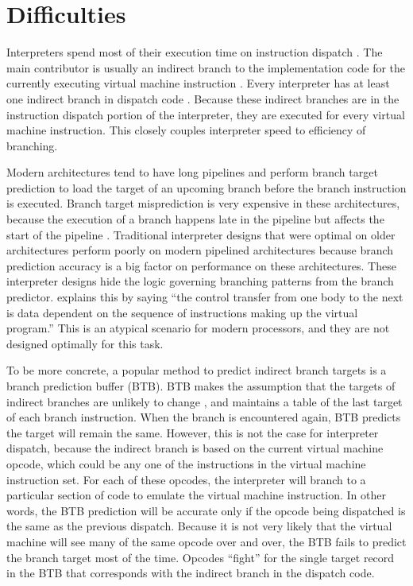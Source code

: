 	\section{Difficulties}
		Interpreters spend most of their execution time on instruction dispatch \citep{modernarchvm}. The main contributor is usually an indirect branch to the implementation code for the currently executing virtual machine instruction \citep{optimizingindirectbranch}. Every interpreter has at least one indirect branch in dispatch code \citep{modernarchvm}. Because these indirect branches are in the instruction dispatch portion of the interpreter, they are executed for every virtual machine instruction. This closely couples interpreter speed to efficiency of branching.
		
		Modern architectures tend to have long pipelines and perform branch target prediction to load the target of an upcoming branch before the branch instruction is executed. Branch target misprediction is very expensive in these architectures, because the execution of a branch happens late in the pipeline but affects the start of the pipeline \citep{optimizingindirectbranch}. Traditional interpreter designs that were optimal on older architectures perform poorly on modern pipelined architectures because branch prediction accuracy is a big factor on performance on these architectures. These interpreter designs hide the logic governing branching patterns from the branch predictor. \cite{yeti} explains this by saying ``the control transfer from one body to the next is data dependent on the sequence of instructions making up the virtual program.'' This is an atypical scenario for modern processors, and they are not designed optimally for this task.
		
		To be more concrete, a popular method to predict indirect branch targets is a branch prediction buffer (BTB). BTB makes the assumption that the targets of indirect branches are unlikely to change \citep{yeti}, and maintains a table of the last target of each branch instruction. When the branch is encountered again, BTB predicts the target will remain the same. However, this is not the case for interpreter dispatch, because the indirect branch is based on the current virtual machine opcode, which could be any one of the instructions in the virtual machine instruction set. For each of these opcodes, the interpreter will branch to a particular section of code to emulate the virtual machine instruction. In other words, the BTB prediction will be accurate only if the opcode being dispatched is the same as the previous dispatch. Because it is not very likely that the virtual machine will see many of the same opcode over and over, the BTB fails to predict the branch target most of the time. Opcodes ``fight'' for the single target record in the BTB that corresponds with the indirect branch in the dispatch code.
		
